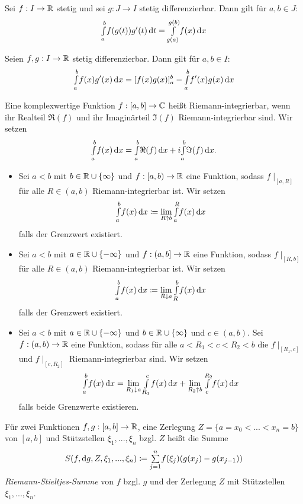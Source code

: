 \documentclass{cheat-sheet}
\begin{document}
\begin{satz}
Sei $f : I \to \mathbb{R}$ stetig und sei $g : J \to I$ stetig differenzierbar. Dann gilt für $a, b \in J$:
\[ {\textstyle \int\limits_{a}^{b}} f(g(t))g'(t) \,\mathrm{d} t = {\textstyle \int\limits_{g(a)}^{g(b)}} f(x) \,\mathrm{d} x \]
\end{satz}

\begin{satz}
Seien $f, g : I \to \mathbb{R}$ stetig differenzierbar. Dann gilt für $a, b \in I$:
\[ {\textstyle \int\limits_{a}^{b}} f(x)g'(x) \,\mathrm{d} x = [f(x)g(x)]_a^b - {\textstyle \int\limits_{a}^{b}} f'(x)g(x) \,\mathrm{d} x \]
\end{satz}

\begin{defn}
Eine komplexwertige Funktion $f : [a, b] \to \mathbb{C}$ heißt Riemann-integrierbar, wenn ihr Realteil $\Re(f)$ und ihr Imaginärteil $\Im(f)$ Riemann-integrierbar sind. Wir setzen
\[ {\textstyle \int\limits_{a}^{b}} f(x) \,\mathrm{d} x = {\textstyle \int\limits_{a}^{b}} \Re(f) \,\mathrm{d} x + i {\textstyle \int\limits_{a}^{b}} \Im(f) \,\mathrm{d} x. \]
\end{defn}

\begin{defn}
\begin{itemize}
  \item Sei $a < b$ mit $b \in \mathbb{R} \cup \{ \infty \}$ und $f : [a, b) \to \mathbb{R}$ eine Funktion, sodass $f\mid_{[a, R]}$ für alle $R \in (a, b)$ Riemann-integrierbar ist. Wir setzen
  \[ {\textstyle \int\limits_{a}^{b}} f(x) \,\mathrm{d} x \coloneqq \lim_{R \uparrow b} {\textstyle \int\limits_{a}^{R}} f(x) \,\mathrm{d} x \]
  falls der Grenzwert existiert.
  \item Sei $a < b$ mit $a \in \mathbb{R} \cup \{ -\infty \}$ und $f : (a, b] \to \mathbb{R}$ eine Funktion, sodass $f\mid_{[R, b]}$ für alle $R \in (a, b)$ Riemann-integrierbar ist. Wir setzen
  \[ {\textstyle \int\limits_{a}^{b}} f(x) \,\mathrm{d} x \coloneqq \lim_{R \downarrow a} {\textstyle \int\limits_{R}^{b}} f(x) \,\mathrm{d} x \]
  falls der Grenzwert existiert.
  \item Sei $a < b$ mit $a \in \mathbb{R} \cup \{ -\infty \}$ und $b \in \mathbb{R} \cup \{ \infty \}$ und $c \in (a, b)$. Sei $f : (a, b) \to \mathbb{R}$ eine Funktion, sodass für alle $a < R_1 < c < R_2 < b$ die $f\mid_{[R_1, c]}$ und $f\mid_{[c, R_2]}$ Riemann-integrierbar sind. Wir setzen
  \[ {\textstyle \int\limits_{a}^{b}} f(x) \,\mathrm{d} x = \lim_{R_1 \downarrow a} {\textstyle \int\limits_{R_1}^{c}} f(x) \,\mathrm{d} x + \lim_{R_2 \uparrow b} {\textstyle \int\limits_{c}^{R_2}} f(x) \,\mathrm{d} x \]
  falls beide Grenzwerte existieren.
\end{itemize}
\end{defn}


\begin{defn}
Für zwei Funktionen $f, g : [a, b] \to \mathbb{R}$, eine Zerlegung $Z = \{ a = x_0 < ... < x_n = b \}$ von $[a, b]$ und Stützstellen $\xi_1, ..., \xi_n$ bzgl. $Z$ heißt die Summe
\[ S(f, \d g, Z, \xi_1, ..., \xi_n) \coloneqq \sum_{j=1}^{n}\!f(\xi_j)(g(x_j) - g(x_{j{-}1})) \]
\emph{Riemann-Stieltjes-Summe} von $f$ bzgl. $g$ und der Zerlegung $Z$ mit Stützstellen $\xi_1, ..., \xi_n$.
\end{defn}
\end{document}
